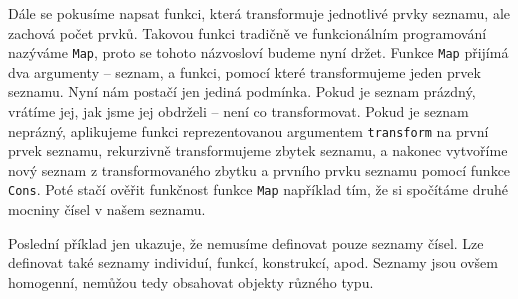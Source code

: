Dále se pokusíme napsat funkci, která transformuje jednotlivé prvky seznamu, ale zachová počet
prvků. Takovou funkci tradičně ve funkcionálním programování nazýváme \lstinline{Map}, proto se
tohoto názvosloví budeme nyní držet. Funkce \lstinline{Map} přijímá dva argumenty -- seznam, a
funkci, pomocí které transformujeme jeden prvek seznamu. Nyní nám postačí jen jediná podmínka.
Pokud je seznam prázdný, vrátíme jej, jak jsme jej obdrželi -- není co transformovat. Pokud je seznam
neprázný, aplikujeme funkci reprezentovanou argumentem \lstinline{transform} na první prvek
seznamu, rekurzivně transformujeme zbytek seznamu, a nakonec vytvoříme nový seznam
z transformovaného zbytku a prvního prvku seznamu pomocí funkce \lstinline{Cons}. Poté stačí ověřit
funkčnost funkce \lstinline{Map} například tím, že si spočítáme druhé mocniny čísel v našem seznamu.

Poslední příklad jen ukazuje, že nemusíme definovat pouze seznamy čísel. Lze definovat také seznamy
individuí, funkcí, konstrukcí, apod. Seznamy jsou ovšem homogenní, nemůžou tedy obsahovat objekty
různého typu.

